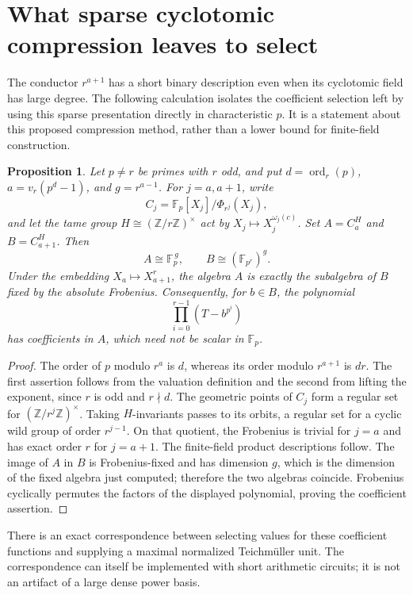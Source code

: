 \documentclass[11pt]{article}
\newtheorem{proposition}[theorem]{Proposition}
\theoremstyle{definition}
\theoremstyle{remark}
\begin{document}
\section{What sparse cyclotomic compression leaves to select}
\label{sec:sparse-cyclotomic-selector}

The conductor \(r^{a+1}\) has a short binary description even
when its cyclotomic field has large degree. The following
calculation isolates the coefficient selection left by using
this sparse presentation directly in characteristic \(p\).
It is a statement about this proposed compression method,
rather than a lower bound for finite-field construction.

\begin{proposition}\label{prop:sparse-wild-coefficient-algebra}
Let \(p\ne r\) be primes with \(r\) odd, and put
\(d=\operatorname{ord}_r(p)\), \(a=v_r(p^d-1)\), and
\(g=r^{a-1}\). For \(j=a,a+1\), write
\[
 C_j=\mathbb F_p[X_j]/\Phi_{r^j}(X_j),
\]
and let the tame group \(H\cong(\mathbb Z/r\mathbb Z)^\times\)
act by \(X_j\mapsto X_j^{\omega_j(c)}\).
Set \(A=C_a^H\) and \(B=C_{a+1}^H\).
Then
\[
 A\cong\mathbb F_p^{\,g},\qquad
 B\cong(\mathbb F_{p^r})^{g}.
\]
Under the embedding \(X_a\mapsto X_{a+1}^r\), the algebra
\(A\) is exactly the subalgebra of \(B\) fixed by the
absolute Frobenius. Consequently, for \(b\in B\), the
polynomial
\[
                   \prod_{i=0}^{r-1}(T-b^{p^i})
\]
has coefficients in \(A\), which need not be scalar in
\(\mathbb F_p\).
\end{proposition}
\begin{proof}
The order of \(p\) modulo \(r^a\) is \(d\), whereas its
order modulo \(r^{a+1}\) is \(dr\). The first assertion
follows from the valuation definition and the second from
lifting the exponent, since \(r\) is odd and \(r\nmid d\).
The geometric points of \(C_j\) form a regular set for
\((\mathbb Z/r^j\mathbb Z)^\times\). Taking \(H\)-invariants
passes to its orbits, a regular set for a cyclic wild group
of order \(r^{j-1}\). On that quotient, the Frobenius is
trivial for \(j=a\) and has exact order \(r\) for \(j=a+1\).
The finite-field product descriptions follow. The image of
\(A\) in \(B\) is Frobenius-fixed and has dimension \(g\),
which is the dimension of the fixed algebra just computed;
therefore the two algebras coincide. Frobenius cyclically
permutes the factors of the displayed polynomial, proving
the coefficient assertion.
\end{proof}

There is an exact correspondence between selecting values
for these coefficient functions and supplying a maximal
normalized Teichm\"uller unit. The correspondence can itself
be implemented with short arithmetic circuits; it is not an
artifact of a large dense power basis.
\end{document}
